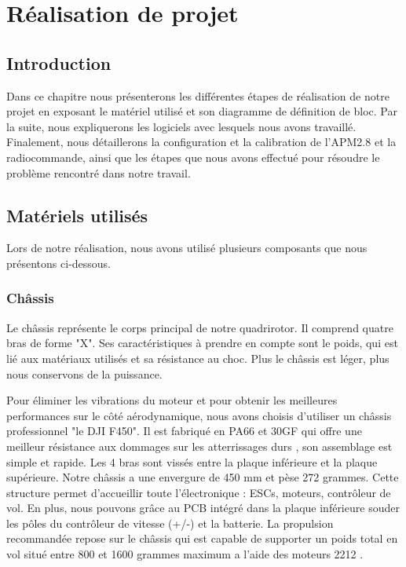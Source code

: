 

	

\chapter{Réalisation de projet}
\newpage
	\section*{Introduction}
	
		Dans ce chapitre nous présenterons les différentes étapes de réalisation de notre projet en exposant le matériel utilisé et son diagramme de définition de bloc. Par la suite, nous expliquerons les logiciels avec lesquels nous avons travaillé. Finalement, nous détaillerons la configuration et la calibration de l'APM2.8 et la radiocommande, ainsi que les étapes que nous avons effectué pour résoudre le problème rencontré dans notre travail. 
	
	\section{Matériels utilisés}
	Lors de notre réalisation, nous avons utilisé plusieurs composants que nous présentons ci-dessous.
	\subsection{Châssis}
	Le châssis représente le corps principal de notre quadrirotor. Il comprend quatre bras de forme "X". Ses caractéristiques à prendre en compte sont le poids, qui est lié aux matériaux utilisés et sa résistance au choc. Plus le châssis est léger, plus nous conservons de la puissance.
	
	Pour éliminer les vibrations du moteur et pour obtenir les meilleures performances sur le côté aérodynamique, nous avons choisis d’utiliser un châssis professionnel "le DJI F450". Il est fabriqué en PA66 et 30GF qui offre une meilleur résistance aux dommages sur les atterrissages durs \cite{smartcube}, son assemblage est simple et rapide. Les 4 bras sont vissés entre la plaque inférieure et la plaque supérieure. Notre châssis a une envergure de 450 mm et pèse 272 grammes.
	Cette structure permet d'accueillir toute l'électronique : ESCs, moteurs, contrôleur de vol. En plus, nous pouvons grâce au PCB intégré dans la plaque inférieure souder les pôles du contrôleur de vitesse (+/-) et la batterie. La propulsion recommandée repose sur le châssis qui est capable de supporter un poids total en vol situé entre 800 et 1600 grammes maximum a l'aide des moteurs 2212 \cite{studiosport}.
	
